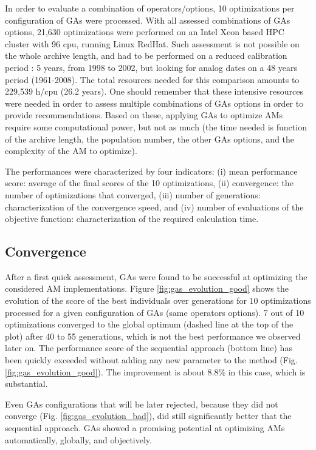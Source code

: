 \documentclass{ametsoc}
\begin{document}
In order to evaluate a combination of operators/options, 10 optimizations per configuration of GAs were processed. With all assessed combinations of GAs options, 21,630 optimizations were performed on an Intel Xeon based HPC cluster with 96 cpu, running Linux RedHat. Such assessment is not possible on the whole archive length, and had to be performed on a reduced calibration period : 5 years, from 1998 to 2002, but looking for analog dates on a 48 years period (1961-2008). The total resources needed for this comparison amounts to 229,539 h/cpu (26.2 years). One should remember that these intensive resources were needed in order to assess multiple combinations of GAs options in order to provide recommendations. Based on these, applying GAs to optimize AMs require some computational power, but not as much (the time needed is function of the archive length, the population number, the other GAs options, and the complexity of the AM to optimize). 

The performances were characterized by four indicators: (i) mean performance score: average of the final scores of the 10 optimizations, (ii) convergence: the number of optimizations that converged, (iii) number of generations: characterization of the convergence speed, and (iv) number of evaluations of the objective function: characterization of the required calculation time.


\subsection{Convergence}

After a first quick assessment, GAs were found to be successful at optimizing the considered AM implementations. Figure \ref{fig:gas_evolution_good} shows the evolution of the score of the best individuals over generations for 10 optimizations processed for a given configuration of GAs (same operators options). 7 out of 10 optimizations converged to the global optimum (dashed line at the top of the plot) after 40 to 55 generations, which is not the best performance we observed later on. The performance score of the sequential approach (bottom line) has been quickly exceeded without adding any new parameter to the method (Fig. \ref{fig:gas_evolution_good}). The improvement is about 8.8\% in this case, which is substantial.

Even GAs configurations that will be later rejected, because they did not converge (Fig. \ref{fig:gas_evolution_bad}), did still significantly better that the sequential approach. GAs showed a promising potential at optimizing AMs automatically, globally, and objectively.
\end{document}
